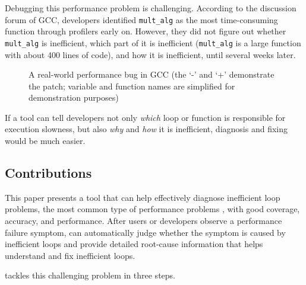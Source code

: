 Debugging this performance problem is challenging. According to 
the discussion forum of GCC, developers identified
\texttt{mult\_alg} as the most time-consuming function
through profilers early on. However, they did not figure out 
whether \texttt{mult\_alg} is inefficient, which part of it is 
inefficient (\texttt{mult\_alg} is a large function with about 400 lines of 
code), and how it is inefficient, until several weeks later.

\begin{figure}
\centering
{}
  \mbox{}
\caption{A real-world performance bug in GCC (the `-' and `+' demonstrate the patch; variable and 
function names are simplified for demonstration purposes)}
\vspace{-0.1in}
\label{fig:GCC27733}
\end{figure}



If a tool can tell developers not only \emph{which} loop or function is
responsible for execution slowness, but also \emph{why} and \emph{how}
it is inefficient, 
diagnosis and fixing
would be much easier. 

\iffalse
Clearly, more research is needed to improve the state of the art of performance
diagnosis --- better diagnosis
coverage, better diagnosis accuracy, and low run-time
overhead for common performance problems,
especially loop-related performance problems.
\fi


\subsection{Contributions}
This paper presents a tool \Tool that can help effectively diagnose
inefficient loop problems, the most common type of performance problems
\cite{SongOOPSLA2014,PerfBug}, with good coverage, accuracy, and performance.
After users or developers observe a performance failure symptom, \Tool can 
automatically judge whether the symptom is caused by inefficient loops and
provide detailed root-cause information that helps understand and fix 
inefficient loops. 


\Tool tackles this challenging problem in three steps.

